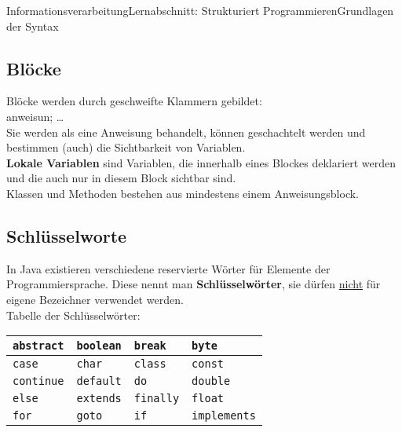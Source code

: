 \documentclass[11pt,oneside,openany,headings=optiontotoc,11pt,numbers=noenddot]{article}
\begin{document}
\begin{worksheet}{Informationsverarbeitung}{Lernabschnitt: Strukturiert Programmieren}{Grundlagen der Syntax}
		\subsection{Blöcke}
		Blöcke werden durch geschweifte Klammern {} gebildet:\\
		{ anweisun; \ldots }\\
		Sie werden als eine Anweisung behandelt, können geschachtelt werden und bestimmen (auch) die Sichtbarkeit von Variablen.\\
		\textbf{Lokale Variablen} sind Variablen, die innerhalb eines Blockes deklariert werden und die auch nur in diesem Block sichtbar sind.\\
		Klassen und Methoden bestehen aus mindestens einem Anweisungsblock.
		
		\subsection{Schlüsselworte}
		In Java existieren verschiedene reservierte Wörter für Elemente der Programmiersprache. Diese nennt man \textbf{Schlüsselwörter}, sie dürfen \underline{nicht} für eigene Bezeichner verwendet werden.\\
		\newpage
		\noindent
		Tabelle der Schlüsselwörter:\\
		\par\noindent
		\begin{tabularx}{\textwidth}{|X|X|X|X|}
			\hline
			{\lstinline[style=JavaInputStyle]{abstract}} & {\lstinline[style=JavaInputStyle]{boolean}} & {\lstinline[style=JavaInputStyle]{break}} & {\lstinline[style=JavaInputStyle]{byte}}\\
			\hline
			{\lstinline[style=JavaInputStyle]{case}} & {\lstinline[style=JavaInputStyle]{char}} & {\lstinline[style=JavaInputStyle]{class}} & {\lstinline[style=JavaInputStyle]{const}}\\
			\hline
			{\lstinline[style=JavaInputStyle]{continue}} & {\lstinline[style=JavaInputStyle]{default}} & {\lstinline[style=JavaInputStyle]{do}} & {\lstinline[style=JavaInputStyle]{double}}\\
			\hline
			{\lstinline[style=JavaInputStyle]{else}} & {\lstinline[style=JavaInputStyle]{extends}} & {\lstinline[style=JavaInputStyle]{finally}} & {\lstinline[style=JavaInputStyle]{float}}\\
			\hline
			{\lstinline[style=JavaInputStyle]{for}} & {\lstinline[style=JavaInputStyle]{goto}} & {\lstinline[style=JavaInputStyle]{if}} & {\lstinline[style=JavaInputStyle]{implements}}\\

\end{tabularx}
\end{worksheet}
\end{document}
